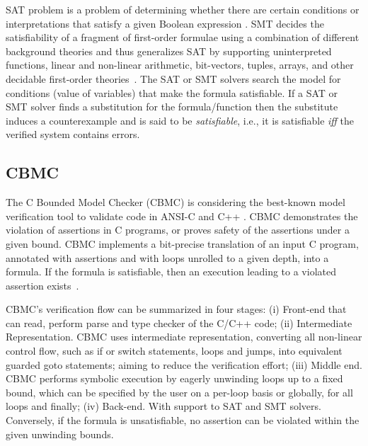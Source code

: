 \documentclass[runningheads]{llncs}
\begin{document}
SAT problem is a problem of determining whether there are certain conditions or interpretations that satisfy a given Boolean expression \cite{ClarkeHV18}. 
SMT decides the satisfiability of a fragment of first-order formulae using a combination of different background theories and thus generalizes SAT by supporting uninterpreted functions, linear and non-linear arithmetic, bit-vectors, tuples, arrays, and other decidable first-order theories~\cite{ClarkeHV18}.
The SAT or SMT solvers search the model for conditions (value of variables) that make the formula satisfiable. If a SAT or SMT solver finds a substitution for the formula/function then the substitute induces a counterexample and is said to be \textit{satisfiable}, i.e., it is satisfiable \textit{iff} the verified system contains errors.  
%
%
%
\subsection{CBMC}
The C Bounded Model Checker (CBMC) is considering the best-known model verification tool to validate code in ANSI-C and C++ \cite{Kroening}. CBMC demonstrates the violation of assertions in C programs, or proves safety of the assertions under a given bound.
CBMC implements a bit-precise translation of an input C program, annotated
with assertions and with loops unrolled to a given depth, into a formula. If the
formula is satisfiable, then an execution leading to a violated assertion exists~\cite{Kroening}.

CBMC's verification flow can be summarized in four stages: (i) Front-end that can read, perform parse and type checker of the C/C++ code; (ii) Intermediate Representation. CBMC uses  intermediate representation, converting all non-linear control flow, such as if or switch statements, loops and jumps, into equivalent guarded goto statements; aiming to reduce the verification effort; (iii) Middle end. CBMC performs symbolic execution by eagerly unwinding loops up to a fixed bound, which can be specified by the user on a per-loop basis or globally, for all loops and finally; (iv) Back-end. With support to SAT and SMT solvers. Conversely, if the formula is unsatisfiable, no assertion can be violated within the given unwinding bounds.
\end{document}
